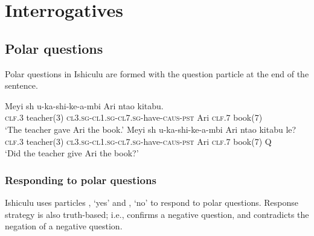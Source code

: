 \chapter{Interrogatives}

\section{Polar questions}

Polar questions in Ishiculu are formed with the question particle \textit{} at the end of the sentence.

\begin{exe}
\ex
\begin{xlist}
\ex
\gll Meyi {sh\textramshorns} u-ka-shi-ke-\textbeltl a-mbi Ari nta\textbeltl o kitabu. \\
\textsc{clf.3} teacher(3) \textsc{cl3.sg}-\textsc{cl1.sg}-\textsc{cl7.sg}-have-\textsc{caus}-\textsc{pst} Ari \textsc{clf.7} book(7) \\
\trans `The teacher gave Ari the book.'
\ex
\gll Meyi {sh\textramshorns} u-ka-shi-ke-\textbeltl a-mbi Ari nta\textbeltl o kitabu le? \\
\textsc{clf.3} teacher(3) \textsc{cl3.sg}-\textsc{cl1.sg}-\textsc{cl7.sg}-have-\textsc{caus}-\textsc{pst} Ari \textsc{clf.7} book(7) Q \\
\trans `Did the teacher give Ari the book?'
\end{xlist}
\end{exe}

\subsection{Responding to polar questions}

Ishiculu uses particles \textit{}, `yes' and \textit{}, `no' to respond to polar questions. Response strategy is also truth-based; i.e., \textit{} confirms a negative question, and \textit{} contradicts the negation of a negative question.


